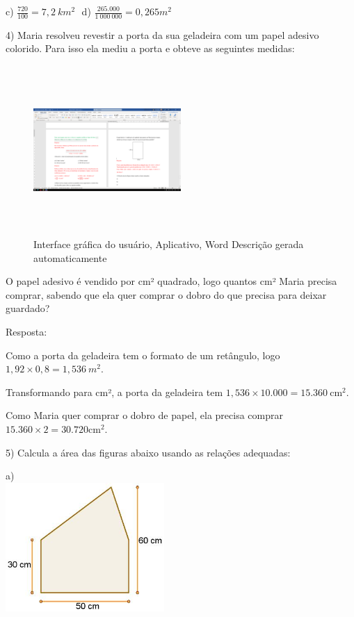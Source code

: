 c)
\(\frac{720}{100} = 7,2\ km^{2}\text{\ \ \ \ \ \ \ \ \ \ \ \ \ \ \ \ \ \ \ \ \ \ \ \ \ \ \ \ \ \ \ \ \ \ \ \ \ \ \ \ \ \ \ \ \ \ \ \ \ \ \ \ \ }\)d)
\(\frac{265.000}{1\ 000\ 000} = 0,265m^2\)

4) Maria resolveu revestir a porta da sua geladeira com um papel adesivo
colorido. Para isso ela mediu a porta e obteve as seguintes medidas:

\begin{figure}
\centering
\includegraphics[width=2.21129in,height=2.53648in]{./imgSAEB_7_MAT/media/image87.png}
\caption{Interface gráfica do usuário, Aplicativo, Word Descrição gerada
automaticamente}
\end{figure}

O papel adesivo é vendido por cm² quadrado, logo quantos cm² Maria
precisa comprar, sabendo que ela quer comprar o dobro do que precisa
para deixar guardado?

Resposta:

Como a porta da geladeira tem o formato de um retângulo, logo
\(1,92 \times 0,8 = 1,536\ m^{2}\).

Transformando para cm², a porta da geladeira tem
\(1,536 \times 10.000 = 15.360\ \text{cm}^2\).

Como Maria quer comprar o dobro de papel, ela precisa comprar
\(15.360 \times 2 = 30.720\text{cm}^2\).

5) Calcula a área das figuras abaixo usando as relações adequadas:

a)\\
\includegraphics[width=2.37667in,height=1.92913in]{./imgSAEB_7_MAT/media/image88.jpg}

